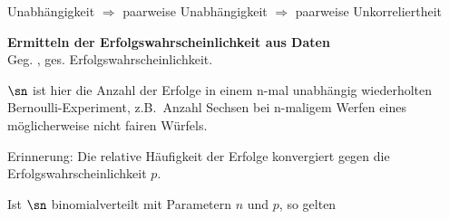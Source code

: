 \begin{bem} 
Unabhängigkeit $\Rightarrow$ paarweise Unabhängigkeit $\Rightarrow$ paarweise Unkorreliertheit
\end{bem}
\begin{bem} 
\end{bem}
\begin{bsp}
    \textbf{Ermitteln der Erfolgswahrscheinlichkeit aus Daten}   \\
    Geg. \ma{\sn}, ges.   Erfolgswahrscheinlichkeit.

    $\sn$ ist hier die Anzahl der Erfolge in einem n-mal unabhängig wiederholten Bernoulli-Experiment,
    z.B.\ Anzahl Sechsen bei n-maligem Werfen eines möglicherweise nicht fairen Würfels.

    Erinnerung: Die relative Häufigkeit  der Erfolge
    konvergiert gegen die Erfolgswahrscheinlichkeit $p$. 
\end{bsp}


\begin{notation} 
\end{notation}

\begin{er} 
Ist $\sn$ binomialverteilt mit Parametern $n$ und $p$, so gelten
\end{er}


